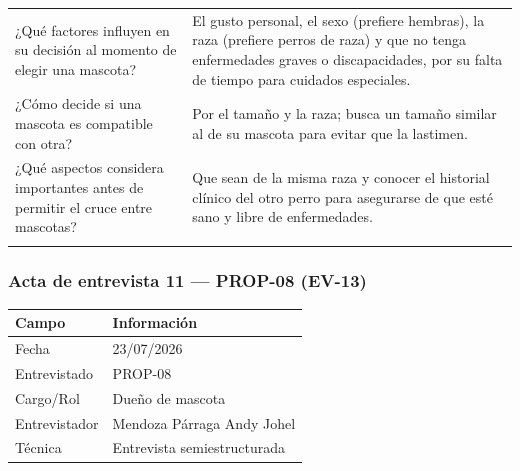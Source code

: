 \documentclass[journal,onecolumn]{IEEEtran}
\begin{document}
{\begin{longtable}{@{}p{5.6cm} p{9.4cm}@{}}
			¿Qué factores influyen en su decisión al momento de elegir una mascota? & El gusto personal, el sexo (prefiere hembras), la raza (prefiere perros de raza) y que no tenga enfermedades graves o discapacidades, por su falta de tiempo para cuidados especiales. \\ \addlinespace
			
			¿Cómo decide si una mascota es compatible con otra? & Por el tamaño y la raza; busca un tamaño similar al de su mascota para evitar que la lastimen. \\ \addlinespace
			
			¿Qué aspectos considera importantes antes de permitir el cruce entre mascotas? & Que sean de la misma raza y conocer el historial clínico del otro perro para asegurarse de que esté sano y libre de enfermedades. \\ \addlinespace
			
		\end{longtable}
	}
	
	
	\subsubsection*{Acta de entrevista 11 --- PROP-08 (EV-13)}
	
	\begin{table}[H]
		\centering\small
		\begin{tabularx}{\textwidth}{@{}l X@{}}
			\toprule
			\textbf{Campo} & \textbf{Información} \\
			\midrule
			
			Fecha & 23/07/2026 \\
			
			Entrevistado & PROP-08 \\
			
			Cargo/Rol & Dueño de mascota \\
			
			Entrevistador & Mendoza Párraga Andy Johel \\
			
			Técnica & Entrevista semiestructurada \\
			
			\bottomrule
		\end{tabularx}
	\end{table}
	
\end{document}
